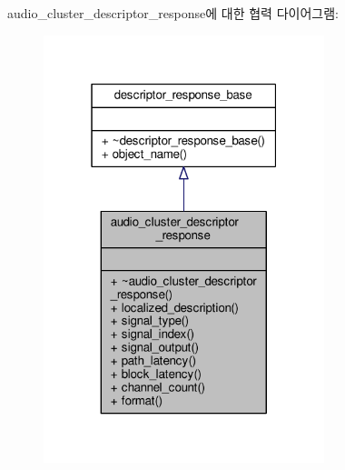 audio\+\_\+cluster\+\_\+descriptor\+\_\+response에 대한 협력 다이어그램\+:
\nopagebreak
\begin{figure}[H]
\begin{center}
\leavevmode
\includegraphics[width=232pt]{classavdecc__lib_1_1audio__cluster__descriptor__response__coll__graph}
\end{center}
\end{figure}
